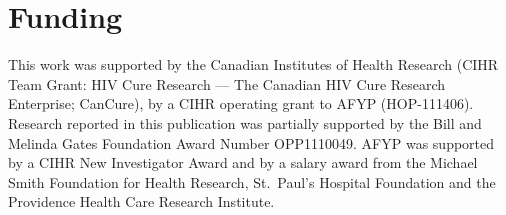 \documentclass{bioinfo}
\begin{document}
\vspace*{-15pt}

\section*{Funding} \label{sec:fund}
This work was supported by the Canadian Institutes of Health Research (CIHR Team Grant: HIV Cure Research --- The Canadian HIV Cure Research Enterprise; CanCure), by a CIHR operating grant to AFYP (HOP-111406).
Research reported in this publication was partially supported by the Bill and Melinda Gates Foundation Award Number OPP1110049.
AFYP was supported by a CIHR New Investigator Award and by a salary award from the Michael Smith Foundation for Health Research, St.~Paul's Hospital Foundation and the Providence Health Care Research Institute.
\end{document}
